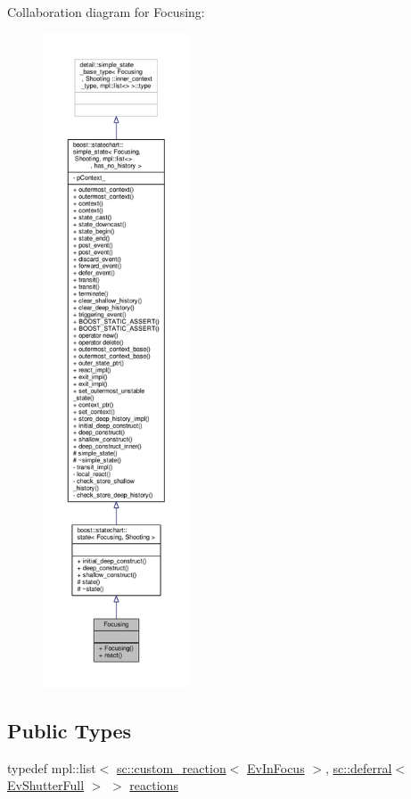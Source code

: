 Collaboration diagram for Focusing\+:
\nopagebreak
\begin{figure}[H]
\begin{center}
\leavevmode
\includegraphics[height=550pt]{struct_focusing__coll__graph}
\end{center}
\end{figure}
\subsection*{Public Types}
\begin{DoxyCompactItemize}
\item 
typedef mpl\+::list$<$ \mbox{\hyperlink{classboost_1_1statechart_1_1custom__reaction}{sc\+::custom\+\_\+reaction}}$<$ \mbox{\hyperlink{struct_ev_in_focus}{Ev\+In\+Focus}} $>$, \mbox{\hyperlink{classboost_1_1statechart_1_1deferral}{sc\+::deferral}}$<$ \mbox{\hyperlink{struct_ev_shutter_full}{Ev\+Shutter\+Full}} $>$ $>$ \mbox{\hyperlink{struct_focusing_a0e833724cdd0bfa7958c23f2da1cc853}{reactions}}
\end{DoxyCompactItemize}
